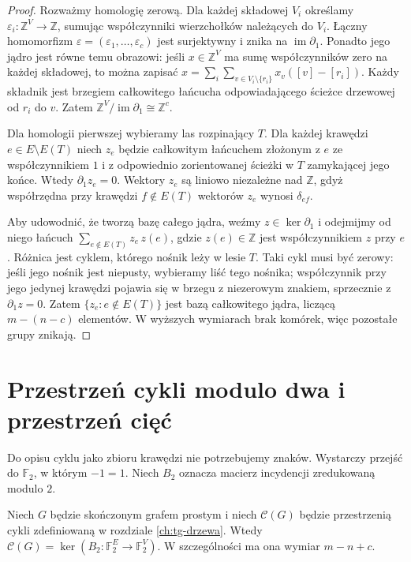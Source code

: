 \begin{proof}
Rozważmy homologię zerową. Dla każdej składowej $V_i$ określamy
$\varepsilon_i:\mathbb Z^V\to\mathbb Z$, sumując współczynniki
wierzchołków należących do $V_i$. Łączny homomorfizm
$\varepsilon=(\varepsilon_1,\ldots,\varepsilon_c)$ jest surjektywny
i znika na $\operatorname{im}\partial_1$. Ponadto jego jądro jest
równe temu obrazowi: jeśli $x\in\mathbb Z^V$ ma sumę współczynników
zero na każdej składowej, to można zapisać
$x=\sum_i\sum_{v\in V_i\setminus\{r_i\}}x_v([v]-[r_i])$.
Każdy składnik jest brzegiem całkowitego łańcucha odpowiadającego
ścieżce drzewowej od $r_i$ do $v$. Zatem
$\mathbb Z^V/\operatorname{im}\partial_1\cong\mathbb Z^c$.

Dla homologii pierwszej wybieramy las rozpinający $T$.
Dla każdej krawędzi $e\in E\setminus E(T)$ niech $z_e$
będzie całkowitym łańcuchem złożonym z $e$ ze współczynnikiem
$1$ i z odpowiednio zorientowanej ścieżki w $T$ zamykającej jego
końce. Wtedy $\partial_1z_e=0$. Wektory $z_e$ są liniowo
niezależne nad $\mathbb Z$, gdyż współrzędna przy krawędzi
$f\notin E(T)$ wektorów $z_e$ wynosi $\delta_{ef}$.

Aby udowodnić, że tworzą bazę całego jądra, weźmy
$z\in\ker\partial_1$ i odejmijmy od niego łańcuch
$\sum_{e\notin E(T)}z_e\,z(e)$, gdzie $z(e)\in\mathbb Z$
jest współczynnikiem $z$ przy $e$. Różnica jest cyklem,
którego nośnik leży w lesie $T$. Taki cykl musi być zerowy:
jeśli jego nośnik jest niepusty, wybieramy liść tego nośnika;
współczynnik przy jego jedynej krawędzi pojawia się w brzegu
z niezerowym znakiem, sprzecznie z $\partial_1z=0$.
Zatem $\{z_e:e\notin E(T)\}$ jest bazą całkowitego
jądra, liczącą $m-(n-c)$ elementów. W wyższych wymiarach
brak komórek, więc pozostałe grupy znikają.
\end{proof}

\section{Przestrzeń cykli modulo dwa i przestrzeń cięć}
\label{sec:tg-cut-cycle}

Do opisu cyklu jako zbioru krawędzi nie potrzebujemy znaków.
Wystarczy przejść do $\mathbb F_2$, w którym $-1=1$.
Niech $B_2$ oznacza macierz incydencji zredukowaną modulo $2$.

\begin{stwierdzenie}
Niech $G$ będzie skończonym grafem prostym i niech
$\mathcal C(G)$ będzie przestrzenią cykli zdefiniowaną
w rozdziale \ref{ch:tg-drzewa}. Wtedy
$\mathcal C(G)=\ker(B_2:\mathbb F_2^E\to\mathbb F_2^V)$.
W szczególności ma ona wymiar $m-n+c$.
\end{stwierdzenie}

